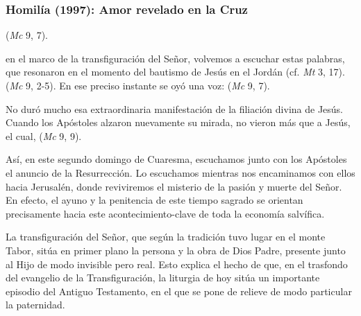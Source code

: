 \label{b2-03-02-1994H}
\newpage 

\subsubsection{Homilía (1997): Amor revelado en la Cruz}


\begin{body}
 (\textit{Mc} 9, 7). 

 en el marco de la transfiguración del Señor, volvemos a escuchar estas palabras, que resonaron en el momento del bautismo de Jesús en el Jordán (cf. \textit{Mt} 3, 17).  (\textit{Mc} 9, 2-5). En ese preciso instante se oyó una voz:  (\textit{Mc} 9, 7).

No duró mucho esa extraordinaria manifestación de la filiación divina de Jesús. Cuando los Apóstoles alzaron nuevamente su mirada, no vieron más que a Jesús, el cual,  (\textit{Mc} 9, 9).

Así, en este segundo domingo de Cuaresma, escuchamos junto con los Apóstoles el anuncio de la Resurrección. Lo escuchamos mientras nos encaminamos con ellos hacia Jerusalén, donde reviviremos el misterio de la pasión y muerte del Señor. En efecto, el ayuno y la penitencia de este tiempo sagrado se orientan precisamente hacia este acontecimiento-clave de toda la economía salvífica.

La transfiguración del Señor, que según la tradición tuvo lugar en el monte Tabor, sitúa en primer plano la persona y la obra de Dios Padre, presente junto al Hijo de modo invisible pero real. Esto explica el hecho de que, en el trasfondo del evangelio de la Transfiguración, la liturgia de hoy sitúa un importante episodio del Antiguo Testamento, en el que se pone de relieve de modo particular la paternidad.


\end{body}
